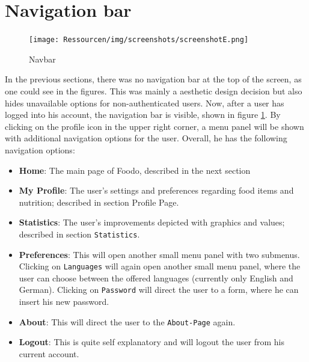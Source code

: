 \section*{Navigation bar}
\vspace{-2em}
\begin{figure}[H]
	\captionsetup{justification=centering}
	\begin{center}
		\texttt{[image: Ressourcen/img/screenshots/screenshotE.png]}
		\vspace{-3em}
		\caption{Navbar}
		\label{fig:navbar}
	\end{center}
\end{figure}
\vspace{-3em}
In the previous sections, there was no navigation bar at the top of the screen, as one could see in the figures. This was mainly a aesthetic design decision but also hides unavailable options for non-authenticated users. Now, after a user has logged into his account, the navigation bar is visible, shown in figure \ref{fig:navbar}. By clicking on the profile icon in the upper right corner, a menu panel will be shown with additional navigation options for the user. Overall, he has the following navigation options:
\begin{itemize}
\item \textbf{Home}: The main page of Foodo, described in the next section
\item \textbf{My Profile}: The user's settings and preferences regarding food items and nutrition; described in section Profile Page.
\item \textbf{Statistics}: The user's improvements depicted with graphics and values; described in section \texttt{Statistics}.
\item \textbf{Preferences}: This will open another small menu panel with two submenus. Clicking on \texttt{Languages} will again open another small menu panel, where the user can choose between the offered languages (currently only English and German). Clicking on \texttt{Password} will direct the user to a form, where he can insert his new password.
\item \textbf{About}: This will direct the user to the \texttt{About-Page} again.
\item \textbf{Logout}: This is quite self explanatory and will logout the user from his current account.
\end{itemize}
